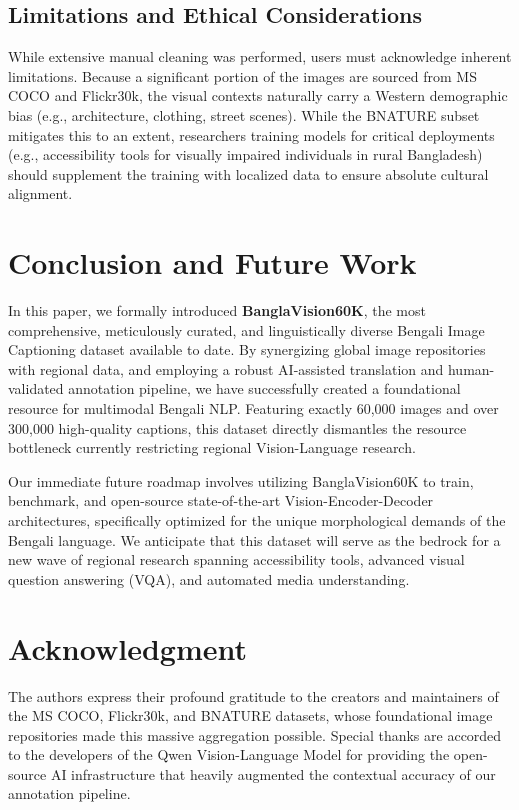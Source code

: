 \documentclass[conference]{IEEEtran}
\begin{document}
\subsection{Limitations and Ethical Considerations}
While extensive manual cleaning was performed, users must acknowledge inherent limitations. Because a significant portion of the images are sourced from MS COCO and Flickr30k, the visual contexts naturally carry a Western demographic bias (e.g., architecture, clothing, street scenes). While the BNATURE subset mitigates this to an extent, researchers training models for critical deployments (e.g., accessibility tools for visually impaired individuals in rural Bangladesh) should supplement the training with localized data to ensure absolute cultural alignment.

\section{Conclusion and Future Work}
In this paper, we formally introduced \textbf{BanglaVision60K}, the most comprehensive, meticulously curated, and linguistically diverse Bengali Image Captioning dataset available to date. By synergizing global image repositories with regional data, and employing a robust AI-assisted translation and human-validated annotation pipeline, we have successfully created a foundational resource for multimodal Bengali NLP. Featuring exactly 60,000 images and over 300,000 high-quality captions, this dataset directly dismantles the resource bottleneck currently restricting regional Vision-Language research.

Our immediate future roadmap involves utilizing BanglaVision60K to train, benchmark, and open-source state-of-the-art Vision-Encoder-Decoder architectures, specifically optimized for the unique morphological demands of the Bengali language. We anticipate that this dataset will serve as the bedrock for a new wave of regional research spanning accessibility tools, advanced visual question answering (VQA), and automated media understanding.

\section*{Acknowledgment}
The authors express their profound gratitude to the creators and maintainers of the MS COCO, Flickr30k, and BNATURE datasets, whose foundational image repositories made this massive aggregation possible. Special thanks are accorded to the developers of the Qwen Vision-Language Model for providing the open-source AI infrastructure that heavily augmented the contextual accuracy of our annotation pipeline.



\end{document}
